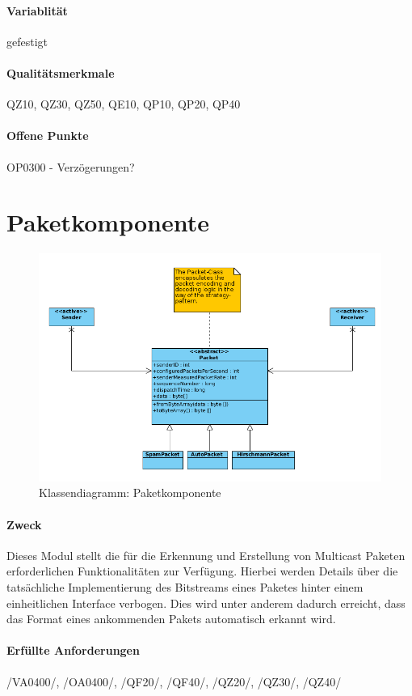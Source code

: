 \paragraph{Variablität} gefestigt
\paragraph{Qualitätsmerkmale}
QZ10, QZ30, QZ50, QE10, QP10, QP20, QP40
\paragraph{Offene Punkte}
OP0300 - Verzögerungen?

\section{Paketkomponente}
\label{sec:4:empf}
\begin{figure}[H]
\includegraphics[width=15cm]{images/Package.png}
\centering
\caption{Klassendiagramm: Paketkomponente}
\label{uml_controller}
\end{figure}

\paragraph{Zweck}
Dieses Modul stellt die für die Erkennung und Erstellung von Multicast Paketen 
erforderlichen Funktionalitäten zur Verfügung. Hierbei werden Details über die 
tatsächliche Implementierung des Bitstreams eines Paketes hinter einem 
einheitlichen Interface verbogen. Dies wird unter anderem dadurch erreicht, dass
das Format eines ankommenden Pakets automatisch erkannt wird.
\paragraph{Erfüllte Anforderungen}
/VA0400/, /OA0400/, /QF20/, /QF40/, /QZ20/, /QZ30/, /QZ40/ 
